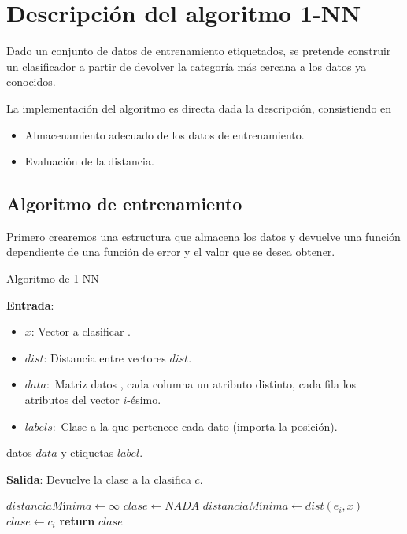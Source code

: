 \section{ Descripción del algoritmo 1-NN}

Dado un conjunto de datos de entrenamiento etiquetados, se pretende construir un clasificador 
a partir de devolver la categoría más cercana a los datos ya conocidos. 

La implementación del algoritmo es directa dada la descripción, consistiendo en 

\begin{itemize}
    \item Almacenamiento adecuado de los datos de entrenamiento.
    \item Evaluación de la distancia.
\end{itemize}

\subsection{Algoritmo de entrenamiento}

Primero crearemos una estructura que almacena los datos y devuelve
una función dependiente de una función de error 
y el valor que se desea obtener.

\begin{algorithm}
    \caption{Algoritmo de  1-NN}\label{euclid}
    \hspace*{\algorithmicindent} 
        \textbf{Entrada}:
        \begin{itemize}
            \item $x$: Vector a clasificar .
            \item $dist$: Distancia entre vectores $dist$.
            \item $data:$ Matriz  datos , cada columna un atributo distinto, cada fila los atributos del vector $i$-ésimo.
            \item $labels:$ Clase a la que pertenece cada dato (importa la posición).
        \end{itemize}
         datos $data$ y etiquetas $label$.
        
        \hspace*{\algorithmicindent} 
        \textbf{Salida}:
    Devuelve la clase a la clasifica $c$.        
    \begin{algorithmic}[1]
          \State $distanciaMínima \gets\infty$
          \State $clase \leftarrow NADA$
                \State $distanciaMínima \gets dist(e_i, x)$
                \State $clase  \gets c_i$
            \EndIf
        \EndFor
        \State \textbf{return} $clase$
      \EndProcedure
    \end{algorithmic}
  \end{algorithm}
